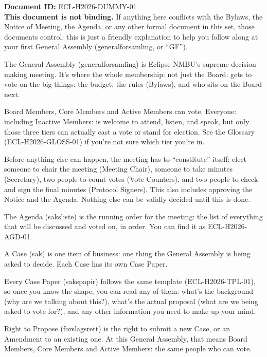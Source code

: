 \documentclass{../../../Common/Latex/Templates/rapport}
\date{\today}
\begin{document}
\makecoverpage
\tableofcontents
\reportmainmatter

\noindent\textbf{Document ID:} ECL-H2026-DUMMY-01\\
\textbf{This document is not binding.} If anything here conflicts with the Bylaws, the Notice of Meeting, the Agenda, or any other formal document in this set, those documents control: this is just a friendly explanation to help you follow along at your first General Assembly (generalforsamling, or ``GF'').

The General Assembly (generalforsamling) is Eclipse NMBU's supreme decision-making meeting. It's where the whole membership: not just the Board: gets to vote on the big things: the budget, the rules (Bylaws), and who sits on the Board next.

Board Members, Core Members and Active Members can vote. Everyone: including Inactive Members: is welcome to attend, listen, and speak, but only those three tiers can actually cast a vote or stand for election. See the Glossary (ECL-H2026-GLOSS-01) if you're not sure which tier you're in.

Before anything else can happen, the meeting has to ``constitute'' itself: elect someone to chair the meeting (Meeting Chair), someone to take minutes (Secretary), two people to count votes (Vote Counters), and two people to check and sign the final minutes (Protocol Signers). This also includes approving the Notice and the Agenda. Nothing else can be validly decided until this is done.

The Agenda (saksliste) is the running order for the meeting: the list of everything that will be discussed and voted on, in order. You can find it as ECL-H2026-AGD-01.

A Case (sak) is one item of business: one thing the General Assembly is being asked to decide. Each Case has its own Case Paper.

Every Case Paper (sakspapir) follows the same template (ECL-H2026-TPL-01), so once you know the shape, you can read any of them: what's the background (why are we talking about this?), what's the actual proposal (what are we being asked to vote for?), and any other information you need to make up your mind.

Right to Propose (forslagsrett) is the right to submit a new Case, or an Amendment to an existing one. At this General Assembly, that means Board Members, Core Members and Active Members: the same people who can vote.
\end{document}
